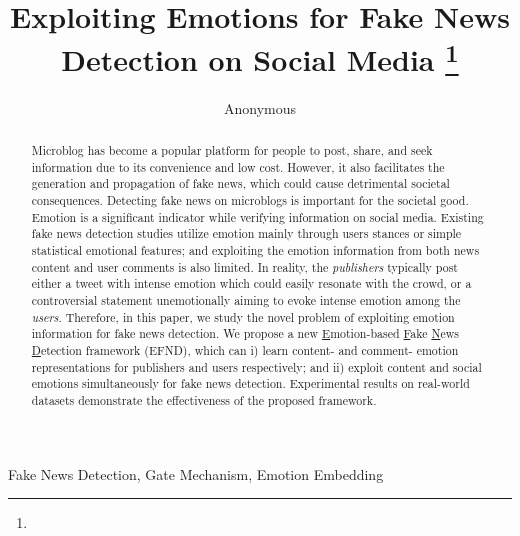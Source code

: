 \documentclass[conference]{IEEEtran}
\newcommand{\m}{EFND}
\begin{document}
	
	\title{Exploiting Emotions for Fake News Detection on Social Media
		\thanks{}
	}
	
	\author{Anonymous}
	
	\maketitle
	
	\begin{abstract}
		Microblog has become a popular platform for people to post, share, and seek information due to its convenience and low cost. However, it also facilitates the generation and propagation of fake news, which could cause detrimental societal consequences. Detecting fake news on microblogs is important for the societal good. Emotion is a significant indicator while verifying information on social media. 
		Existing fake news detection studies utilize emotion mainly through users stances or simple statistical emotional features; and exploiting the emotion information from both news content and user comments is also limited. In reality, the \textit{publishers} typically post either  a tweet with intense emotion which could easily resonate with the crowd, or a controversial statement unemotionally aiming to evoke intense emotion among the \textit{users}. 
		Therefore, in this paper, we study the novel problem of exploiting emotion information for fake news detection. We propose a new \underline{E}motion-based \underline{F}ake \underline{N}ews \underline{D}etection framework ({\m}), which can i) learn content- and comment- emotion representations for publishers and users respectively; and ii) exploit content and social emotions simultaneously for fake news detection. Experimental results on real-world datasets demonstrate the effectiveness of the proposed framework.
	\end{abstract}
	
	\begin{IEEEkeywords}
		Fake News Detection, Gate Mechanism, Emotion Embedding
	\end{IEEEkeywords}
	
\end{document}
